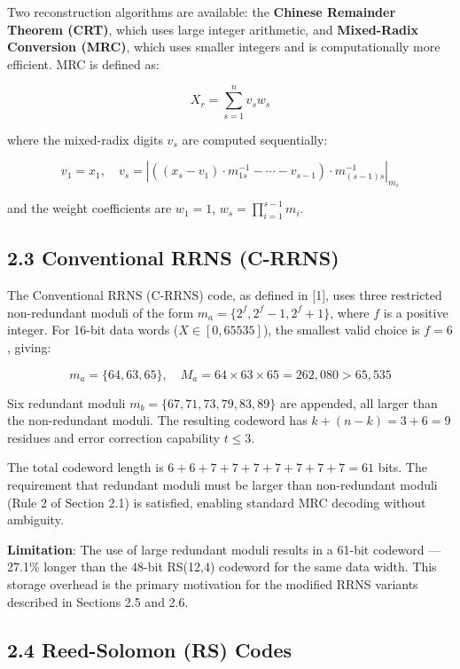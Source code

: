 Two reconstruction algorithms are available: the \textbf{Chinese
Remainder Theorem (CRT)}, which uses large integer arithmetic, and
\textbf{Mixed-Radix Conversion (MRC)}, which uses smaller integers and
is computationally more efficient. MRC is defined as:

\[X_r = \sum_{s=1}^{n} v_s w_s\]

where the mixed-radix digits \(v_s\) are computed sequentially:

\[v_1 = x_1, \quad v_s = \left| \left( (x_s - v_1) \cdot m_{1s}^{-1} - \cdots - v_{s-1} \right) \cdot m_{(s-1)s}^{-1} \right|_{m_s}\]

and the weight coefficients are \(w_1 = 1\),
\(w_s = \prod_{i=1}^{s-1} m_i\).

\subsection{2.3 Conventional RRNS
(C-RRNS)}\label{conventional-rrns-c-rrns}

The Conventional RRNS (C-RRNS) code, as defined in {[}1{]}, uses three
restricted non-redundant moduli of the form
\(m_a = \{2^f, 2^f - 1, 2^f + 1\}\), where \(f\) is a positive integer.
For 16-bit data words (\(X \in [0, 65535]\)), the smallest valid choice
is \(f = 6\), giving:

\[m_a = \{64, 63, 65\}, \quad M_a = 64 \times 63 \times 65 = 262{,}080 > 65{,}535\]

Six redundant moduli \(m_b = \{67, 71, 73, 79, 83, 89\}\) are appended,
all larger than the non-redundant moduli. The resulting codeword has
\(k + (n-k) = 3 + 6 = 9\) residues and error correction capability
\(t \leq 3\).

The total codeword length is \(6 + 6 + 7 + 7 + 7 + 7 + 7 + 7 + 7 = 61\)
bits. The requirement that redundant moduli must be larger than
non-redundant moduli (Rule 2 of Section 2.1) is satisfied, enabling
standard MRC decoding without ambiguity.

\textbf{Limitation}: The use of large redundant moduli results in a
61-bit codeword --- 27.1\% longer than the 48-bit RS(12,4) codeword for
the same data width. This storage overhead is the primary motivation for
the modified RRNS variants described in Sections 2.5 and 2.6.

\subsection{2.4 Reed-Solomon (RS) Codes}\label{reed-solomon-rs-codes}

